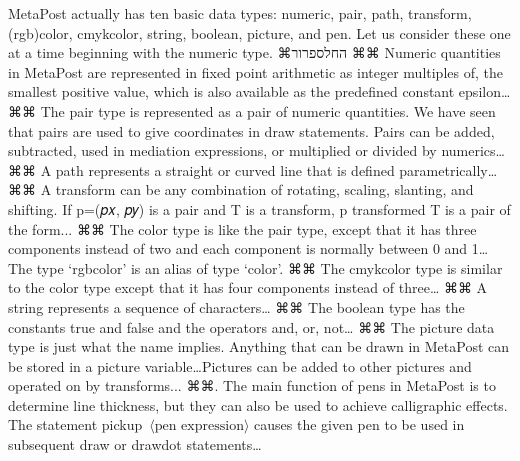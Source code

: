       MetaPost actually has ten basic data types: numeric, pair, path, transform, (rgb)color, cmykcolor, string, boolean, picture, and pen. Let us consider these one at a time beginning with the numeric type.
        ⌘החל{ספרור}
      ⌘⌘ Numeric quantities in MetaPost are represented in fixed point arithmetic as integer multiples of, the smallest positive value, which is also available as the predefined constant epsilon…
      ⌘⌘ The pair type is represented as a pair of numeric quantities. We have seen that pairs are used to give coordinates in draw statements. Pairs can be added, subtracted, used in mediation expressions, or multiplied or divided by numerics…
      ⌘⌘ A path represents a straight or curved line that is defined parametrically…
      ⌘⌘ A transform can be any combination of rotating, scaling, slanting, and shifting. If p=(𝑝𝑥, 𝑝𝑦) is a pair and T is a transform,
      p transformed T
      is a pair of the form...
      ⌘⌘ The color type is like the pair type, except that it has three components instead of two and each component is normally between 0 and 1…The type ‘rgbcolor’ is an alias of type ‘color’.
      ⌘⌘ The cmykcolor type is similar to the color type except that it has four components instead of three…
      ⌘⌘ A string represents a sequence of characters…
      ⌘⌘ The boolean type has the constants true and false and the operators and, or, not…
      ⌘⌘ The picture data type is just what the name implies. Anything that can be drawn in MetaPost can be stored in a picture variable…Pictures can be added to other pictures and operated on by transforms...
      ⌘⌘. The main function of pens in MetaPost is to determine line thickness, but they can also be used to achieve calligraphic effects. The statement pickup~$⟨\text{pen expression}⟩$ causes the given pen to be used in subsequent draw or drawdot statements…


